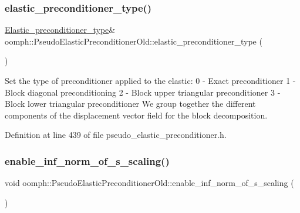 \subsubsection{\texorpdfstring{elastic\+\_\+preconditioner\+\_\+type()}{elastic\_preconditioner\_type()}}
{\footnotesize\ttfamily \hyperlink{classoomph_1_1PseudoElasticPreconditionerOld_a6748360e3e2fbd4766d837a520dadfd0}{Elastic\+\_\+preconditioner\+\_\+type}\& oomph\+::\+Pseudo\+Elastic\+Preconditioner\+Old\+::elastic\+\_\+preconditioner\+\_\+type (\begin{DoxyParamCaption}{ }\end{DoxyParamCaption})\hspace{0.3cm}{\ttfamily [inline]}}



Set the type of preconditioner applied to the elastic\+: 0 -\/ Exact preconditioner 1 -\/ Block diagonal preconditioning 2 -\/ Block upper triangular preconditioner 3 -\/ Block lower triangular preconditioner We group together the different components of the displacement vector field for the block decomposition. 



Definition at line 439 of file pseudo\+\_\+elastic\+\_\+preconditioner.\+h.

\mbox{\label{classoomph_1_1PseudoElasticPreconditionerOld_a5175c5ba92a63e7e47ca87883753b28c}} 
\subsubsection{\texorpdfstring{enable\+\_\+inf\+\_\+norm\+\_\+of\+\_\+s\+\_\+scaling()}{enable\_inf\_norm\_of\_s\_scaling()}}
{\footnotesize\ttfamily void oomph\+::\+Pseudo\+Elastic\+Preconditioner\+Old\+::enable\+\_\+inf\+\_\+norm\+\_\+of\+\_\+s\+\_\+scaling (\begin{DoxyParamCaption}{ }\end{DoxyParamCaption})\hspace{0.3cm}{\ttfamily [inline]}}



